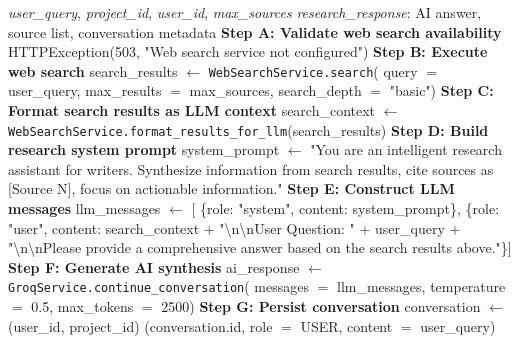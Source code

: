 \begin{algorithm}[H]
\caption{PerformResearchAndSynthesize}
\small\begin{algorithmic}[1]
\Require \textit{user\_query}, \textit{project\_id}, \textit{user\_id}, \textit{max\_sources}
\Ensure \textit{research\_response}: AI answer, source list, conversation metadata
\State \textbf{Step A: Validate web search availability}
    \State \Return HTTPException(503, "Web search service not configured")
\EndIf
\State \textbf{Step B: Execute web search}
\State search\_results $\leftarrow$ \texttt{WebSearchService.search}(
    \Statex \hspace{4em} query $=$ user\_query,
    \Statex \hspace{4em} max\_results $=$ max\_sources,
    \Statex \hspace{4em} search\_depth $=$ "basic")
\State \textbf{Step C: Format search results as LLM context}
\State search\_context $\leftarrow$ \texttt{WebSearchService.format\_results\_for\_llm}(search\_results)
\State \textbf{Step D: Build research system prompt}
\State system\_prompt $\leftarrow$ "You are an intelligent research assistant for writers. Synthesize information from search results, cite sources as [Source N], focus on actionable information."
\State \textbf{Step E: Construct LLM messages}
\State llm\_messages $\leftarrow$ [
    \Statex \hspace{4em} \{role: "system", content: system\_prompt\},
    \Statex \hspace{4em} \{role: "user", content: search\_context + "\textbackslash n\textbackslash nUser Question: " + user\_query + "\textbackslash n\textbackslash nPlease provide a comprehensive answer based on the search results above."\}]
\State \textbf{Step F: Generate AI synthesis}
\State ai\_response $\leftarrow$ \texttt{GroqService.continue\_conversation}(
    \Statex \hspace{4em} messages $=$ llm\_messages,
    \Statex \hspace{4em} temperature $=$ 0.5,
    \Statex \hspace{4em} max\_tokens $=$ 2500)
\State \textbf{Step G: Persist conversation}
\State conversation $\leftarrow$ \texttt{}(user\_id, project\_id)
\State \texttt{}(conversation.id, role $=$ USER, content $=$ user\_query)

\end{algorithmic}
\end{algorithm}
